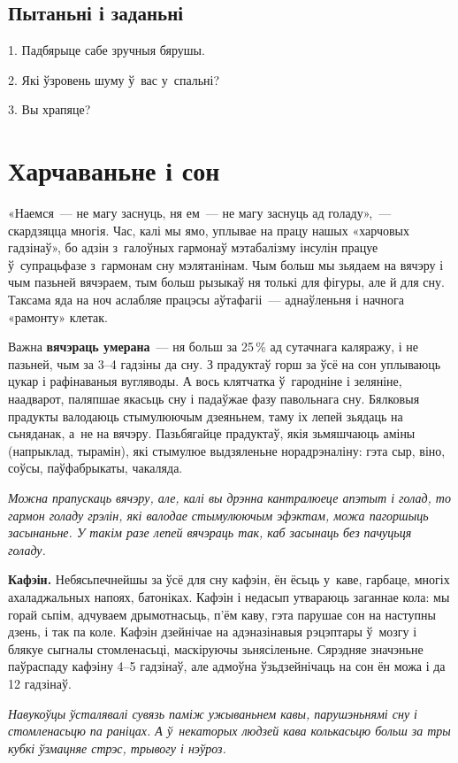 \subsection*{Пытаньні і заданьні}

1. Падбярыце сабе зручныя бярушы.

2. Які ўзровень шуму ў~вас у~спальні?

3. Вы храпяце?


\section{Харчаваньне і сон}

«Наемся~--- не магу заснуць, ня ем~--- не магу заснуць ад голаду»,~--- скардзяцца многія. Час, калі мы ямо, уплывае на працу нашых «харчовых гадзінаў», бо адзін з~галоўных гармонаў мэтабалізму інсулін працуе ў~супрацьфазе з~гармонам сну мэлятанінам. Чым больш мы зьядаем на вячэру і чым пазьней вячэраем, тым больш рызыкаў ня толькі для фігуры, але й для сну. Таксама яда на ноч аслабляе працэсы аўтафагіі~--- аднаўленьня і начнога «рамонту» клетак.

Важна \textbf{вячэраць умерана}~--- ня больш за 25\,\% ад сутачнага каляражу, і не пазьней, чым за 3--4 гадзіны да сну. З прадуктаў горш за ўсё на сон уплываюць цукар і рафінаваныя вугляводы. А вось клятчатка ў~гародніне і зеляніне, наадварот, паляпшае якасьць сну і падаўжае фазу павольнага сну. Бялковыя прадукты валодаюць стымулюючым дзеяньнем, таму іх лепей зьядаць на сьняданак, а~не на вячэру. Пазьбягайце прадуктаў, якія зьмяшчаюць аміны (напрыклад, тырамін), які стымулюе выдзяленьне норадрэналіну: гэта сыр, віно, соўсы, паўфабрыкаты, чакаляда.

\emph{Можна прапускаць вячэру, але, калі вы дрэнна кантралюеце апэтыт і голад, то гармон голаду грэлін, які валодае стымулюючым эфэктам, можа пагоршыць засынаньне. У такім разе лепей вячэраць так, каб засынаць без пачуцьця голаду.}

\textbf{Кафэін.} Небясьпечнейшы за ўсё для сну кафэін, ён ёсьць у~каве, гарбаце, многіх ахаладжальных напоях, батоніках. Кафэін і недасып утвараюць заганнае кола: мы горай сьпім, адчуваем дрымотнасьць, п'ём каву, гэта парушае сон на наступны дзень, і так па коле. Кафэін дзейнічае на адэназінавыя рэцэптары ў~мозгу і блякуе сыгналы стомленасьці, маскіруючы зьнясіленьне. Сярэдняе значэньне паўраспаду кафэіну 4--5 гадзінаў, але адмоўна ўзьдзейнічаць на сон ён можа і да 12 гадзінаў.

\emph{Навукоўцы ўсталявалі сувязь паміж ужываньнем кавы, парушэньнямі сну і стомленасьцю па раніцах. А ў~некаторых людзей кава колькасьцю больш за тры кубкі ўзмацняе стрэс, трывогу і нэўроз.}

